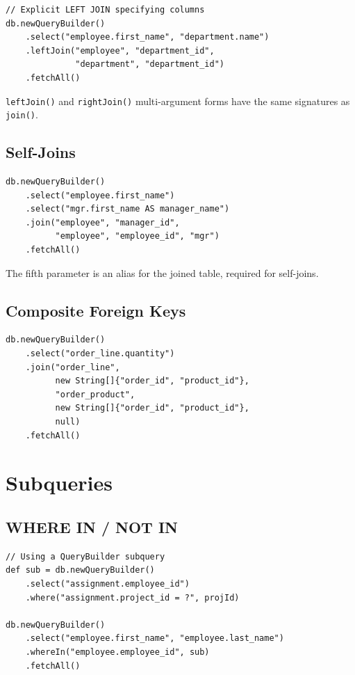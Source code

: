 \begin{lstlisting}[style=groovy]
// Explicit LEFT JOIN specifying columns
db.newQueryBuilder()
    .select("employee.first_name", "department.name")
    .leftJoin("employee", "department_id",
              "department", "department_id")
    .fetchAll()
\end{lstlisting}

\noindent
\texttt{leftJoin()} and \texttt{rightJoin()} multi-argument forms have the same signatures as \texttt{join()}.

\subsection{Self-Joins}

\begin{lstlisting}[style=groovy]
db.newQueryBuilder()
    .select("employee.first_name")
    .select("mgr.first_name AS manager_name")
    .join("employee", "manager_id",
          "employee", "employee_id", "mgr")
    .fetchAll()
\end{lstlisting}

\noindent
The fifth parameter is an alias for the joined table, required for self-joins.

\subsection{Composite Foreign Keys}

\begin{lstlisting}[style=groovy]
db.newQueryBuilder()
    .select("order_line.quantity")
    .join("order_line",
          new String[]{"order_id", "product_id"},
          "order_product",
          new String[]{"order_id", "product_id"},
          null)
    .fetchAll()
\end{lstlisting}

\section{Subqueries}
\label{sec:qb-subqueries}

\subsection{WHERE IN / NOT IN}

\begin{lstlisting}[style=groovy]
// Using a QueryBuilder subquery
def sub = db.newQueryBuilder()
    .select("assignment.employee_id")
    .where("assignment.project_id = ?", projId)

db.newQueryBuilder()
    .select("employee.first_name", "employee.last_name")
    .whereIn("employee.employee_id", sub)
    .fetchAll()
\end{lstlisting}

